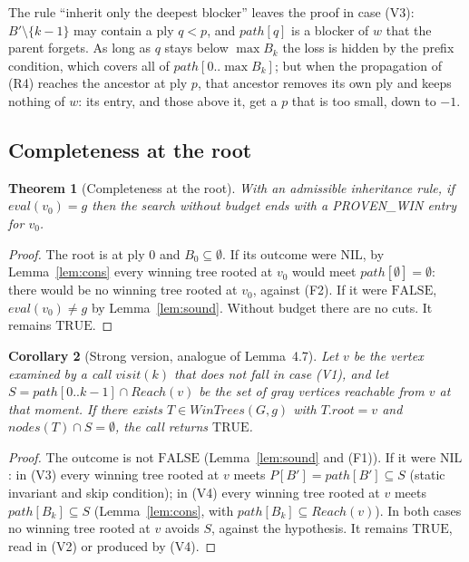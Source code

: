 \documentclass{article}
\theoremstyle{plain}
\newtheorem{theorem}{Theorem}[section]
\newtheorem{corollary}[theorem]{Corollary}
\theoremstyle{definition}
\theoremstyle{remark}
\newcommand{\eval}{\mathit{eval}}
\newcommand{\nodes}{\mathit{nodes}}
\newcommand{\WinTrees}{\mathit{WinTrees}}
\newcommand{\Reach}{\mathit{Reach}}
\newcommand{\TRUE}{\ensuremath{\mathrm{TRUE}}}
\newcommand{\FALSE}{\ensuremath{\mathrm{FALSE}}}
\newcommand{\NIL}{\ensuremath{\mathrm{NIL}}}
\newcommand{\PW}{\textsf{PROVEN\_WIN}}
\begin{document}
The rule ``inherit only the deepest blocker'' leaves the proof in case (V3): $B' \setminus \{k-1\}$ may contain a ply $q < p$, and $\mathit{path}[q]$ is a blocker of $w$ that the parent forgets. As long as $q$ stays below $\max B_k$ the loss is hidden by the prefix condition, which covers all of $\mathit{path}[0..\max B_k]$; but when the propagation of (R4) reaches the ancestor at ply $p$, that ancestor removes its own ply and keeps nothing of $w$: its entry, and those above it, get a $p$ that is too small, down to $-1$.

\subsection{Completeness at the root}

\begin{theorem}[Completeness at the root]\label{thm:root}
With an admissible inheritance rule, if $\eval(v_0) = g$ then the search without budget ends with a \PW{} entry for $v_0$.
\end{theorem}
\begin{proof}
The root is at ply $0$ and $B_0 \subseteq \emptyset$. If its outcome were \NIL{}, by Lemma~\ref{lem:cons} every winning tree rooted at $v_0$ would meet $\mathit{path}[\emptyset] = \emptyset$: there would be no winning tree rooted at $v_0$, against (F2). If it were \FALSE{}, $\eval(v_0) \neq g$ by Lemma~\ref{lem:sound}. Without budget there are no cuts. It remains \TRUE{}.
\end{proof}

\begin{corollary}[Strong version, analogue of Lemma~4.7]\label{cor:strong}
Let $v$ be the vertex examined by a call $\mathit{visit}(k)$ that does not fall in case (V1), and let $S = \mathit{path}[0..k-1] \cap \Reach(v)$ be the set of gray vertices reachable from $v$ at that moment. If there exists $T \in \WinTrees(G, g)$ with $T.\mathit{root} = v$ and $\nodes(T) \cap S = \emptyset$, the call returns \TRUE{}.
\end{corollary}
\begin{proof}
The outcome is not \FALSE{} (Lemma~\ref{lem:sound} and (F1)). If it were \NIL{}: in (V3) every winning tree rooted at $v$ meets $P[B'] = \mathit{path}[B'] \subseteq S$ (static invariant and skip condition); in (V4) every winning tree rooted at $v$ meets $\mathit{path}[B_k] \subseteq S$ (Lemma~\ref{lem:cons}, with $\mathit{path}[B_k] \subseteq \Reach(v)$). In both cases no winning tree rooted at $v$ avoids $S$, against the hypothesis. It remains \TRUE{}, read in (V2) or produced by (V4).
\end{proof}
\end{document}
